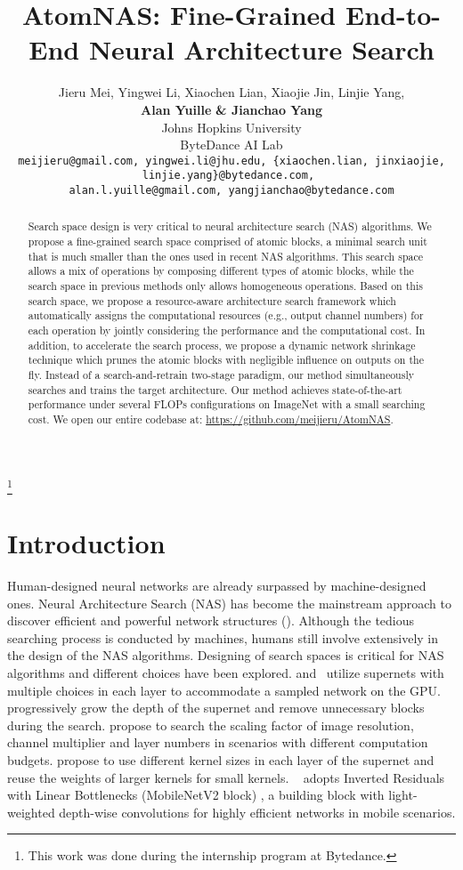 \documentclass{article} \usepackage{iclr2020_conference,times}
\title{AtomNAS: Fine-Grained End-to-End Neural Architecture Search}
\author{Jieru Mei, Yingwei Li, Xiaochen Lian, Xiaojie Jin, Linjie Yang, \\\textbf{Alan Yuille} \textbf{\& Jianchao Yang} \\
Johns Hopkins University\\
ByteDance AI Lab\\
\texttt{\tiny meijieru@gmail.com, yingwei.li@jhu.edu, \{xiaochen.lian, jinxiaojie, linjie.yang\}@bytedance.com, } \\
\texttt{\tiny alan.l.yuille@gmail.com, yangjianchao@bytedance.com}
}
\newcommand{\flops}{FLOPs\xspace}
\begin{document}
\maketitle

\begin{abstract}


Search space design is very critical to neural architecture search (NAS) algorithms. We propose a fine-grained search space comprised of atomic blocks, a minimal search unit that is much smaller than the ones used in recent NAS algorithms.
This search space allows a mix of operations by composing different types of atomic blocks, while the search space in previous methods only allows homogeneous operations. Based on this search space, we propose a resource-aware architecture search framework which automatically assigns the computational resources (e.g., output channel numbers) for each operation by jointly considering the performance and the computational cost. In addition, to accelerate the search process, we propose a dynamic network shrinkage technique which prunes the atomic blocks with negligible influence on outputs on the fly. 
Instead of a search-and-retrain two-stage paradigm, our method simultaneously searches and trains the target architecture. 
Our method achieves state-of-the-art performance under several \flops configurations on ImageNet with a small searching cost.
We open our entire codebase at: \url{https://github.com/meijieru/AtomNAS}.

\end{abstract}

\let\thefootnote\relax\footnote{ This work was done during the internship program at Bytedance.}

\section{Introduction}

Human-designed neural networks are already surpassed by machine-designed ones. Neural Architecture Search (NAS) has become the mainstream approach to discover efficient and powerful network structures (\cite{zoph2017nasnet, hieu2018enas, tan2019mnasnet, hanxiao2019darts}). Although the tedious searching process is conducted by machines, humans still involve extensively in the design of the NAS algorithms. Designing of search spaces is critical for NAS algorithms and different choices have been explored. \cite{han2019proxyless} and~\cite{wu2019fbnet} utilize supernets with multiple choices in each layer to accommodate a sampled network on the GPU. \cite{chen2019pdarts} progressively grow the depth of the supernet and remove unnecessary blocks during the search. \cite{mingxing2019efficient} propose to search the scaling factor of image resolution, channel multiplier and layer numbers in scenarios with different computation budgets. \cite{stamoulis2019single_path} propose to use different kernel sizes in each layer of the supernet and reuse the weights of larger kernels for small kernels. ~\cite{howard2019mobilenetv3,tan2019mixnet} adopts Inverted Residuals with Linear Bottlenecks (MobileNetV2 block) \citep{sandler2018mobilenetv2}, a building block with light-weighted depth-wise convolutions for highly efficient networks in mobile scenarios. 
\end{document}
